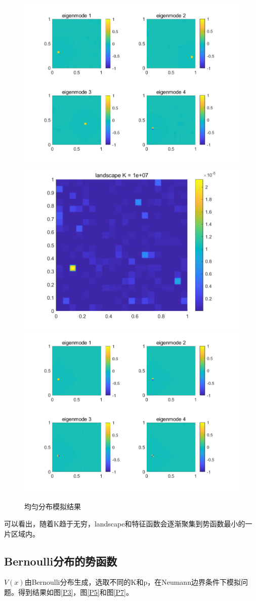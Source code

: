 \documentclass[12pt,a4paper]{article}
\begin{document}
\begin{figure}[htbp]
\includegraphics[width=0.4\linewidth]{potential/P0K3U}
\includegraphics[width=0.4\linewidth]{potential/P0K4W}
\includegraphics[width=0.4\linewidth]{potential/P0K4U}
\caption{均匀分布模拟结果}
\label{P0}
\end{figure}

可以看出，随着K趋于无穷，landscape和特征函数会逐渐聚集到势函数最小的一片区域内。

\subsection{Bernoulli分布的势函数}

$V(x)$由Bernoulli分布生成，选取不同的K和p，在Neumann边界条件下模拟问题。得到结果如图\ref{P3}，图\ref{P5}和图\ref{P7}。
\end{document}
